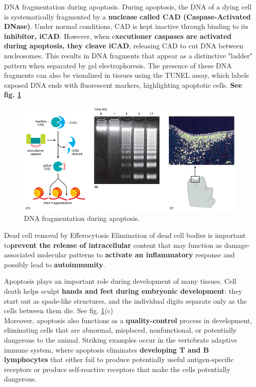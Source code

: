 \documentclass[../main.tex]{subfiles}
\begin{document}
\begin{RemarkWithTitel}{DNA fragmentation during apoptosis.}
	During apoptosis, the DNA of a dying cell is systematically fragmented by a \textbf{nuclease called \gls{CAD} (Caspase-Activated DNase)}. Under normal conditions, CAD is kept inactive through binding to its \textbf{inhibitor, iCAD}. However, when e\textbf{xecutioner caspases are activated during apoptosis, they cleave iCAD}, releasing CAD to cut DNA between nucleosomes. This results in DNA fragments that appear as a distinctive "ladder" pattern when separated by gel electrophoresis. The presence of these DNA fragments can also be visualized in tissues using the TUNEL assay, which labels exposed DNA ends with fluorescent markers, highlighting apoptotic cells. \textbf{See fig. \ref{DNAfragmentation}}
	\begin{figure}[H]
		\centering
		\includegraphics[width = \textwidth]{6}
		\caption{DNA fragmentation during apoptosis.}
		\label{DNAfragmentation}
	\end{figure}
\end{RemarkWithTitel}


\begin{RemarkWithTitel}{Dead cell removal by Efferocytosis}
	Elimination of dead cell bodies is important to\textbf{prevent the release of intracellular} content that may function as damage-associated molecular patterns to \textbf{activate an inflammatory} response and possibly lead to \textbf{autoimmunity}.
\end{RemarkWithTitel}


\begin{RemarkWithTitel}{Apoptosis plays an important role during development of many tissues.}
	Cell death helps sculpt \textbf{hands and feet during embryonic development}: they start out as spade-like structures, and the individual digits separate only as the cells between them die. See fig. \ref{DNAfragmentation}(c)\\
	\indent Moreover, apoptosis also functions as a \textbf{quality-control} process in development, eliminating cells that are abnormal, misplaced, nonfunctional, or potentially dangerous to the animal. Striking examples occur in the vertebrate adaptive immune system, where apoptosis eliminates \textbf{developing T and B lymphocytes} that either fail to produce potentially useful antigen-specific receptors or produce self-reactive receptors 
	that make the cells potentially dangerous. 
\end{RemarkWithTitel}
\end{document}
